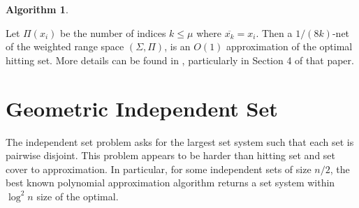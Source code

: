 \documentclass[11pt]{article}
\newtheorem{algorithm}{Algorithm}
\begin{document}
\begin{algorithm}
\label{alg:jiangweialg}
\end{algorithm}

Let $\Pi(x_i)$ be the number of indices $k \leq \mu$ where $\overline{x_k}  = x_i$.  Then a $1/(8k)$-net of the weighted range space $(\Sigma, \Pi)$, is an $O(1)$ approximation of the optimal hitting set. More details can be found in \cite{pan2014hittingset}, particularly in Section 4 of that paper.


\section{Geometric Independent Set}

The independent set problem asks for the largest set system such that each set is pairwise disjoint.  This problem appears to be harder than hitting set and set cover to approximation.  In particular, for some independent sets of size $n/2$, the best known polynomial approximation algorithm returns a set system within $\log^2 n$ size of the optimal.
\end{document}
